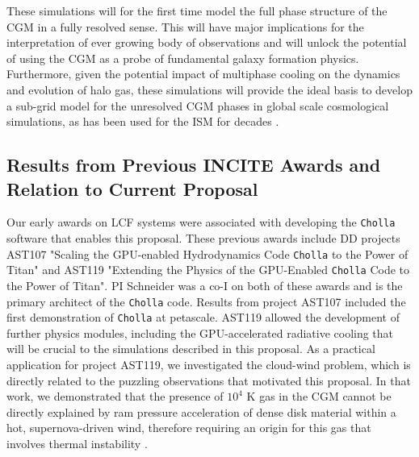 \documentclass[11pt,letterpaper,english]{article}
\begin{document}
These simulations will for the first time model the full phase structure of the CGM in a fully resolved sense. This will have major implications for the interpretation of ever growing body of observations and will unlock the potential of using the CGM as a probe of fundamental galaxy formation physics. Furthermore, given the potential impact of multiphase cooling on the dynamics and evolution of halo gas, these simulations will provide the ideal basis to develop a sub-grid model for the unresolved CGM phases in global scale cosmological simulations, as has been used for the ISM for decades \cite{SpringelHernquist}.




\vspace{-.25in}
\subsection{Results from Previous INCITE Awards and Relation to Current Proposal}
\vspace{-.2in}


Our early awards on LCF systems were associated with developing the {\tt Cholla} software that enables this proposal. These previous awards include DD projects AST107 "Scaling the GPU-enabled Hydrodynamics Code {\tt Cholla} to the Power of Titan" and AST119 "Extending the Physics of the GPU-Enabled {\tt Cholla} Code to the Power of Titan". PI Schneider was a co-I on both of these awards and is the primary architect of the {\tt Cholla} code. Results from project AST107 included the first demonstration of {\tt Cholla} at petascale. AST119 allowed the development of further physics modules, including the GPU-accelerated radiative cooling that will be crucial to the simulations described in this proposal. As a practical application for project AST119, we investigated the cloud-wind problem, which is directly related to the puzzling observations that motivated this proposal. In that work, we demonstrated that the presence of $10^4$ K gas in the CGM cannot be directly explained by ram pressure acceleration of dense disk material within a hot, supernova-driven wind, therefore requiring an origin for this gas that involves thermal instability \cite{Schneider17}.
\end{document}
